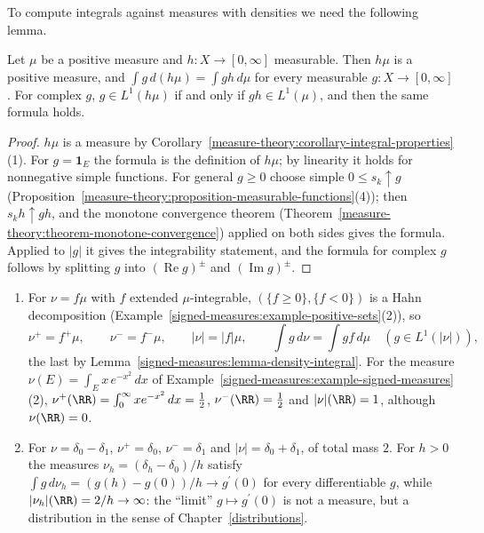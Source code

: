 To compute integrals against measures with densities we need the following lemma.

\begin{lemma}\label{signed-measures:lemma-density-integral}
Let $\mu$ be a positive measure and $h \colon X \to [0, \infty]$ measurable. Then $h\mu$ is a positive measure, and $\int g\,d(h\mu) = \int gh\,d\mu$ for every measurable $g \colon X \to [0, \infty]$.
For complex $g$, $g \in L^1(h\mu)$ if and only if $gh \in L^1(\mu)$, and then the same formula holds.
\end{lemma}

\begin{proof}
$h\mu$ is a measure by Corollary~\ref{measure-theory:corollary-integral-properties}(1). For $g = \mathbf{1}_E$ the formula is the definition of $h\mu$; by linearity it holds for nonnegative simple
functions. For general $g \geq 0$ choose simple $0 \leq s_k \uparrow g$ (Proposition~\ref{measure-theory:proposition-measurable-functions}(4)); then $s_kh \uparrow gh$, and the monotone convergence theorem
(Theorem~\ref{measure-theory:theorem-monotone-convergence}) applied on both sides gives the formula. Applied to $|g|$ it gives the integrability statement, and the formula for complex $g$ follows by
splitting $g$ into $(\operatorname{Re}g)^\pm$ and $(\operatorname{Im}g)^\pm$.
\end{proof}

\begin{example}\label{signed-measures:example-jordan-density}
\begin{enumerate}
\item For $\nu = f\mu$ with $f$ extended $\mu$-integrable, $(\{f \geq 0\}, \{f < 0\})$ is a Hahn decomposition (Example~\ref{signed-measures:example-positive-sets}(2)), so
\[
\nu^+ = f^+\mu, \qquad \nu^- = f^-\mu, \qquad |\nu| = |f|\mu, \qquad \int g\,d\nu = \int gf\,d\mu \quad (g \in L^1(|\nu|)),
\]
the last by Lemma~\ref{signed-measures:lemma-density-integral}. For the measure $\nu(E) = \int_Ex\,e^{-x^2}\,dx$ of Example~\ref{signed-measures:example-signed-measures}(2),
$\nu^+(\RR) = \int_0^\infty xe^{-x^2}\,dx = \frac12$, $\nu^-(\RR) = \frac12$ and $|\nu|(\RR) = 1$, although $\nu(\RR) = 0$.
\item For $\nu = \delta_0 - \delta_1$, $\nu^+ = \delta_0$, $\nu^- = \delta_1$ and $|\nu| = \delta_0 + \delta_1$, of total mass $2$. For $h > 0$ the measures $\nu_h = (\delta_h - \delta_0)/h$ satisfy
$\int g\,d\nu_h = (g(h) - g(0))/h \to g^{\prime}(0)$ for every differentiable $g$, while $|\nu_h|(\RR) = 2/h \to \infty$: the ``limit'' $g \mapsto g^{\prime}(0)$ is not a measure, but a
distribution in the sense of Chapter~\ref{distributions}.
\end{enumerate}
\end{example}

